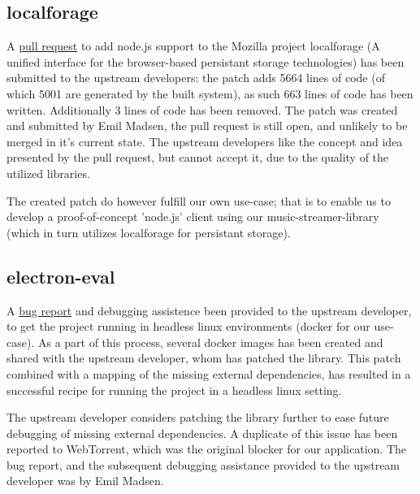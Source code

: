 \subsection{localforage}
A \href{https://github.com/mozilla/localForage/pull/551}{pull request} to add 
node.js support to the Mozilla project localforage (A unified interface for 
the browser-based persistant storage technologies) has been submitted to the
upstream developers: the patch adds 5664 lines of code (of which 5001 are 
generated by the built system), as such 663 lines of code has been written.
Additionally 3 lines of code has been removed.
\newline\newline
The patch was created and submitted by Emil Madsen, the pull request is still
open, and unlikely to be merged in it's current state. The upstream developers
like the concept and idea presented by the pull request, but cannot accept it,
due to the quality of the utilized libraries.

The created patch do however fulfill our own use-case; that is to enable us to 
develop a proof-of-concept 'node.js' client using our music-streamer-library
(which in turn utilizes localforage for persistant storage).

\subsection{electron-eval}
A \href{https://github.com/mappum/electron-eval/issues/29}{bug report} and 
debugging assistence been provided to the upstream developer, to get the project
running in headless linux environments (docker for our use-case).
\newline\newline
As a part of this process, several docker images has been created and shared
with the upstream developer, whom has patched the library. This patch combined
with a mapping of the missing external dependencies, has resulted in a
successful recipe for running the project in a headless linux setting.

The upstream developer considers patching the library further to ease future 
debugging of missing external dependencies. A duplicate of this issue has been
reported to WebTorrent, which was the original blocker for our application.
\newline\newline
The bug report, and the subsequent debugging assistance provided to the
upstream developer was by Emil Madsen.

